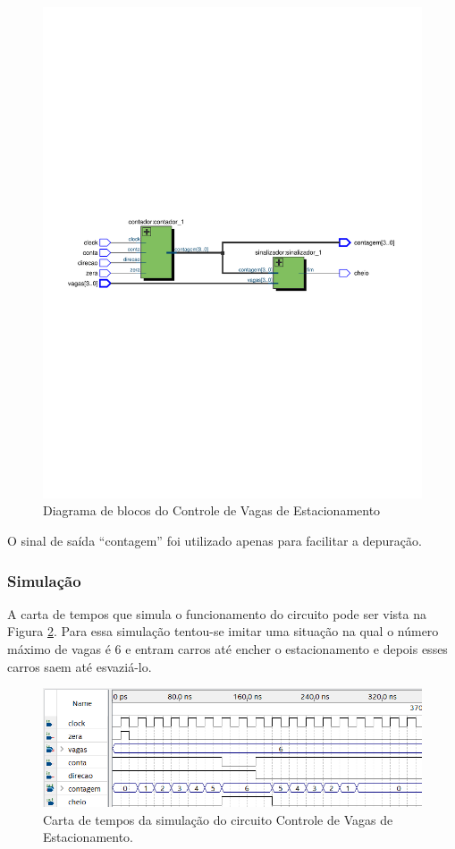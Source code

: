 \documentclass[a4,12pt]{horizon-theme}
\begin{document}
\begin{figure}[!ht]
  \centering
  \includegraphics[width=\textwidth, trim={5mm, 110mm, 5mm, 110mm}, clip]{diagrama.pdf}
  \caption{Diagrama de blocos do Controle de Vagas de Estacionamento}
  \label{fig:diagrama_blocos}
\end{figure}

O sinal de saída ``contagem'' foi utilizado apenas para facilitar a depuração.

\subsubsection{Simulação}

A carta de tempos que simula o funcionamento do circuito pode ser vista na Figura \ref{fig:carta_controle}. Para essa simulação tentou-se imitar uma situação na qual o número máximo de vagas é 6 e entram carros até encher o estacionamento e depois esses carros saem até esvaziá-lo.

\begin{figure}[!ht]
  \centering
  \includegraphics[width=\textwidth]{carta_controle.png}
  \caption{Carta de tempos da simulação do circuito Controle de Vagas de Estacionamento.}
  \label{fig:carta_controle}
\end{figure}
\end{document}
